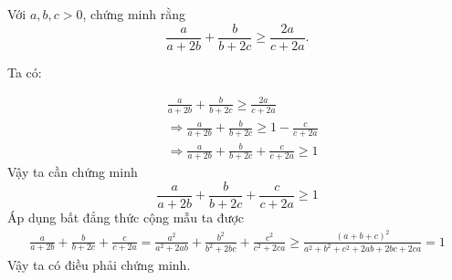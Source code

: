 \begin{problem}
	Với $a, b, c > 0$, chứng minh rằng
	$$
		\frac{a}{a + 2b} + \frac{b}{b + 2c} \ge \frac{2a}{c + 2a}.
	$$
	\solution

	Ta có:

	\begin{align*}
		&\frac{a}{a + 2b} + \frac{b}{b + 2c} \ge \frac{2a}{c + 2a} \\
		&\Rightarrow \frac{a}{a + 2b} + \frac{b}{b + 2c} \ge 1 - \frac{c}{c + 2a} \\ 
		&\Rightarrow \frac{a}{a + 2b} + \frac{b}{b + 2c} + \frac{c}{c + 2a} \ge 1
	\end{align*}
	Vậy ta cần chứng minh
	$$
		\frac{a}{a + 2b} + \frac{b}{b + 2c} + \frac{c}{c + 2a} \ge 1
	$$
	Áp dụng bất đẳng thức cộng mẫu ta được
	\begin{align*}
		\frac{a}{a + 2b} + \frac{b}{b + 2c} + \frac{c}{c + 2a} = \frac{a^2}{a^2 + 2ab} + \frac{b^2}{b^2 + 2bc} + \frac{c^2}{c^2 + 2ca} \ge \frac{(a + b + c)^2}{a^2 + b^2 + c^2 + 2ab + 2bc + 2ca} = 1
	\end{align*}
	Vậy ta có điều phải chứng minh.
\end{problem}